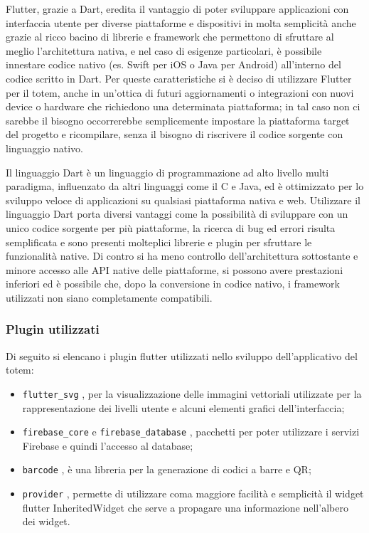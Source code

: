 Flutter, grazie a Dart, eredita il vantaggio di poter sviluppare applicazioni con interfaccia utente per diverse piattaforme e dispositivi in molta semplicità anche grazie al ricco bacino di librerie e framework che permettono di sfruttare al meglio l'architettura nativa, e nel caso di esigenze particolari, è possibile innestare codice nativo (es. Swift per iOS o Java per Android) all'interno del codice scritto in Dart. Per queste caratteristiche si è deciso di utilizzare Flutter per il totem, anche in un'ottica di futuri aggiornamenti o integrazioni con nuovi device o hardware che richiedono una determinata piattaforma; in tal caso non ci sarebbe il bisogno occorrerebbe semplicemente impostare la piattaforma target del progetto e ricompilare, senza il bisogno di riscrivere il codice sorgente con linguaggio nativo.

Il linguaggio Dart è un linguaggio di programmazione ad alto livello multi paradigma, influenzato da altri linguaggi come il C e Java, ed è ottimizzato per lo sviluppo veloce di applicazioni su qualsiasi piattaforma nativa e web.
Utilizzare il linguaggio Dart porta diversi vantaggi come la possibilità di sviluppare con un unico codice sorgente per più piattaforme, la ricerca di bug ed errori risulta semplificata e sono presenti molteplici librerie e plugin per sfruttare le funzionalità native. Di contro si ha meno controllo dell'architettura sottostante e minore accesso alle API native delle piattaforme, si possono avere prestazioni inferiori ed è possibile che, dopo la conversione in codice nativo, i framework utilizzati non siano completamente compatibili.

\subsubsection{Plugin utilizzati}
Di seguito si elencano i plugin flutter utilizzati nello sviluppo dell'applicativo del totem:
\begin{itemize}
    \item \texttt{flutter\_svg} \cite{providerPlugin}, per la visualizzazione delle immagini vettoriali utilizzate per la rappresentazione dei livelli utente e alcuni elementi grafici dell'interfaccia;
    \item \texttt{firebase\_core} \cite{firebaseCorePlugin} e \texttt{firebase\_database} \cite{firebaseDatabasePlugin}, pacchetti per poter utilizzare i servizi Firebase e quindi l'accesso al database;
    \item \texttt{barcode} \cite{barcodePlugin}, è una libreria per la generazione di codici a barre e QR;
    \item \texttt{provider} \cite{providerPlugin}, permette di utilizzare coma maggiore facilità e semplicità il widget flutter InheritedWidget che serve a propagare una informazione nell'albero dei widget.
\end{itemize}
